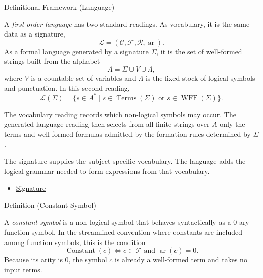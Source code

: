 \begin{definitionalbox}{Definitional Framework (Language)}
\begin{definition}[Language]
\label{def:language}
A \emph{first-order language} has two standard readings. As vocabulary, it is
the same data as a signature,
\[
  \mathcal{L}=(\mathcal{C},\mathcal{F},\mathcal{R},\operatorname{ar}).
\]
As a formal language generated by a signature $\Sigma$, it is the set of
well-formed strings built from the alphabet
\[
  A=\Sigma\cup V\cup\Lambda,
\]
where $V$ is a countable set of variables and $\Lambda$ is the fixed stock of
logical symbols and punctuation. In this second reading,
\[
  \mathcal{L}(\Sigma)
  =\{s\in A^* \mid s\in\operatorname{Terms}(\Sigma)
    \text{ or } s\in\operatorname{WFF}(\Sigma)\}.
\]
\end{definition}
\end{definitionalbox}

\begin{remark*}
The vocabulary reading records which non-logical symbols may occur. The
generated-language reading then selects from all finite strings over $A$ only
the terms and well-formed formulas admitted by the formation rules determined
by $\Sigma$.
\end{remark*}

\begin{remark*}[Interpretation]
The signature supplies the subject-specific vocabulary. The language adds the
logical grammar needed to form expressions from that vocabulary.
\end{remark*}

\begin{dependencies}
\begin{itemize}
  \item \hyperref[def:signature]{Signature}
\end{itemize}
\end{dependencies}

\begin{definitionbox}{Definition (Constant Symbol)}
\begin{definition}
\label{def:signature-constant-symbol}
A \emph{constant symbol} is a non-logical symbol that behaves syntactically as
a $0$-ary function symbol. In the streamlined convention where constants are
included among function symbols, this is the condition
\[
  \operatorname{Constant}(c)
  \iff c\in\mathcal{F}\text{ and }\operatorname{ar}(c)=0.
\]
Because its arity is $0$, the symbol $c$ is already a well-formed term and
takes no input terms.
\end{definition}
\end{definitionbox}

